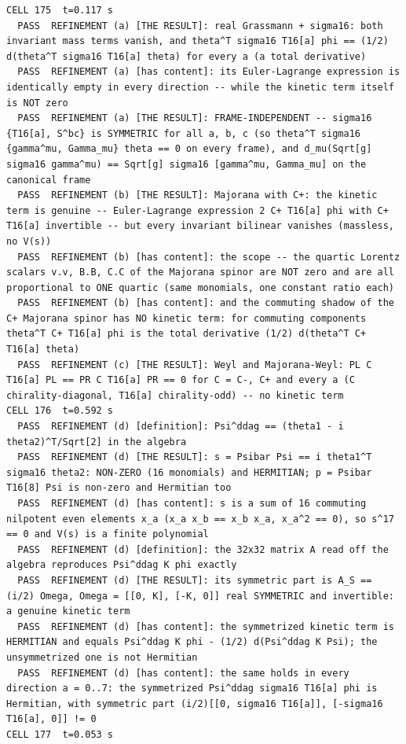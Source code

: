 \begin{Verbatim}[fontsize=\scriptsize]
CELL 175  t=0.117 s
  PASS  REFINEMENT (a) [THE RESULT]: real Grassmann + sigma16: both invariant mass terms vanish, and theta^T sigma16 T16[a] phi == (1/2) d(theta^T sigma16 T16[a] theta) for every a (a total derivative)
  PASS  REFINEMENT (a) [has content]: its Euler-Lagrange expression is identically empty in every direction -- while the kinetic term itself is NOT zero
  PASS  REFINEMENT (a) [THE RESULT]: FRAME-INDEPENDENT -- sigma16 {T16[a], S^bc} is SYMMETRIC for all a, b, c (so theta^T sigma16 {gamma^mu, Gamma_mu} theta == 0 on every frame), and d_mu(Sqrt[g] sigma16 gamma^mu) == Sqrt[g] sigma16 [gamma^mu, Gamma_mu] on the canonical frame
  PASS  REFINEMENT (b) [THE RESULT]: Majorana with C+: the kinetic term is genuine -- Euler-Lagrange expression 2 C+ T16[a] phi with C+ T16[a] invertible -- but every invariant bilinear vanishes (massless, no V(s))
  PASS  REFINEMENT (b) [has content]: the scope -- the quartic Lorentz scalars v.v, B.B, C.C of the Majorana spinor are NOT zero and are all proportional to ONE quartic (same monomials, one constant ratio each)
  PASS  REFINEMENT (b) [has content]: and the commuting shadow of the C+ Majorana spinor has NO kinetic term: for commuting components theta^T C+ T16[a] phi is the total derivative (1/2) d(theta^T C+ T16[a] theta)
  PASS  REFINEMENT (c) [THE RESULT]: Weyl and Majorana-Weyl: PL C T16[a] PL == PR C T16[a] PR == 0 for C = C-, C+ and every a (C chirality-diagonal, T16[a] chirality-odd) -- no kinetic term
CELL 176  t=0.592 s
  PASS  REFINEMENT (d) [definition]: Psi^ddag == (theta1 - i theta2)^T/Sqrt[2] in the algebra
  PASS  REFINEMENT (d) [THE RESULT]: s = Psibar Psi == i theta1^T sigma16 theta2: NON-ZERO (16 monomials) and HERMITIAN; p = Psibar T16[8] Psi is non-zero and Hermitian too
  PASS  REFINEMENT (d) [has content]: s is a sum of 16 commuting nilpotent even elements x_a (x_a x_b == x_b x_a, x_a^2 == 0), so s^17 == 0 and V(s) is a finite polynomial
  PASS  REFINEMENT (d) [definition]: the 32x32 matrix A read off the algebra reproduces Psi^ddag K phi exactly
  PASS  REFINEMENT (d) [THE RESULT]: its symmetric part is A_S == (i/2) Omega, Omega = [[0, K], [-K, 0]] real SYMMETRIC and invertible: a genuine kinetic term
  PASS  REFINEMENT (d) [has content]: the symmetrized kinetic term is HERMITIAN and equals Psi^ddag K phi - (1/2) d(Psi^ddag K Psi); the unsymmetrized one is not Hermitian
  PASS  REFINEMENT (d) [has content]: the same holds in every direction a = 0..7: the symmetrized Psi^ddag sigma16 T16[a] phi is Hermitian, with symmetric part (i/2)[[0, sigma16 T16[a]], [-sigma16 T16[a], 0]] != 0
CELL 177  t=0.053 s

\end{Verbatim}
